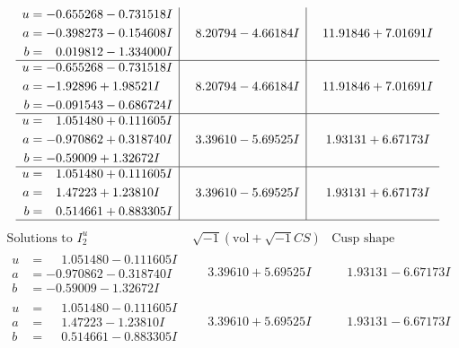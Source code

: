 \documentclass[1p]{elsarticle_modified}
\theoremstyle{definition}
\newcommand{\I}{\sqrt{-1}}
\begin{document}
$$\begin{array}{c|c|c}
\begin{aligned}
u &= -0.655268 - 0.731518 I \\
a &= -0.398273 - 0.154608 I \\
b &= \phantom{-}0.019812 - 1.334000 I\end{aligned}
 & \phantom{-}8.20794 - 4.66184 I & \phantom{-}11.91846 + 7.01691 I \\ \hline\begin{aligned}
u &= -0.655268 - 0.731518 I \\
a &= -1.92896 + 1.98521 I \\
b &= -0.091543 - 0.686724 I\end{aligned}
 & \phantom{-}8.20794 - 4.66184 I & \phantom{-}11.91846 + 7.01691 I \\ \hline\begin{aligned}
u &= \phantom{-}1.051480 + 0.111605 I \\
a &= -0.970862 + 0.318740 I \\
b &= -0.59009 + 1.32672 I\end{aligned}
 & \phantom{-}3.39610 - 5.69525 I & \phantom{-}1.93131 + 6.67173 I \\ \hline\begin{aligned}
u &= \phantom{-}1.051480 + 0.111605 I \\
a &= \phantom{-}1.47223 + 1.23810 I \\
b &= \phantom{-}0.514661 + 0.883305 I\end{aligned}
 & \phantom{-}3.39610 - 5.69525 I & \phantom{-}1.93131 + 6.67173 I\\
 \hline 
 \end{array}$$\newpage$$\begin{array}{c|c|c}  
\text{Solutions to }I^u_{2}& \I (\text{vol} + \sqrt{-1}CS) & \text{Cusp shape}\\
 \hline 
\begin{aligned}
u &= \phantom{-}1.051480 - 0.111605 I \\
a &= -0.970862 - 0.318740 I \\
b &= -0.59009 - 1.32672 I\end{aligned}
 & \phantom{-}3.39610 + 5.69525 I & \phantom{-}1.93131 - 6.67173 I \\ \hline\begin{aligned}
u &= \phantom{-}1.051480 - 0.111605 I \\
a &= \phantom{-}1.47223 - 1.23810 I \\
b &= \phantom{-}0.514661 - 0.883305 I\end{aligned}
 & \phantom{-}3.39610 + 5.69525 I & \phantom{-}1.93131 - 6.67173 I \\ \hline\begin{aligned}

\end{aligned}
\end{array}$$
\end{document}
